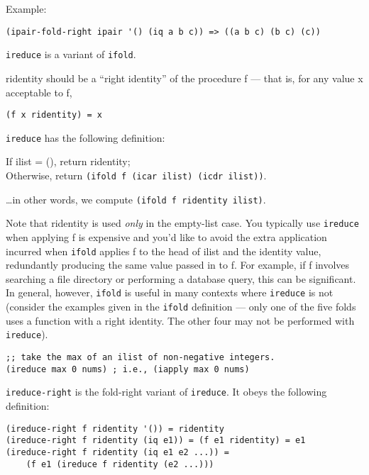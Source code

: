 \begin{description}
Example:

\begin{verbatim}
(ipair-fold-right ipair '() (iq a b c)) => ((a b c) (b c) (c))
\end{verbatim}
\item[ \href{}{} \texttt{ireduce} f ridentity ilist -\textgreater{}
value ]
\texttt{ireduce} is a variant of \texttt{ifold}.

ridentity should be a ``right identity'' of the procedure f --- that is,
for any value x acceptable to f,

\begin{verbatim}
(f x ridentity) = x
\end{verbatim}

\texttt{ireduce} has the following definition:

If ilist = (), return ridentity;\\
Otherwise, return \texttt{(ifold\ f\ (icar\ ilist)\ (icdr\ ilist))}.

\ldots{}in other words, we compute
\texttt{(ifold\ f\ ridentity\ ilist)}.

Note that ridentity is used \emph{only} in the empty-list case. You
typically use \texttt{ireduce} when applying f is expensive and you'd
like to avoid the extra application incurred when \texttt{ifold} applies
f to the head of ilist and the identity value, redundantly producing the
same value passed in to f. For example, if f involves searching a file
directory or performing a database query, this can be significant. In
general, however, \texttt{ifold} is useful in many contexts where
\texttt{ireduce} is not (consider the examples given in the
\texttt{ifold} definition --- only one of the five folds uses a function
with a right identity. The other four may not be performed with
\texttt{ireduce}).

\begin{verbatim}
;; take the max of an ilist of non-negative integers.
(ireduce max 0 nums) ; i.e., (iapply max 0 nums)
\end{verbatim}
\item[ \href{}{} \texttt{ireduce-right} f ridentity ilist
-\textgreater{} value ]
\texttt{ireduce-right} is the fold-right variant of \texttt{ireduce}. It
obeys the following definition:

\begin{verbatim}
(ireduce-right f ridentity '()) = ridentity
(ireduce-right f ridentity (iq e1)) = (f e1 ridentity) = e1
(ireduce-right f ridentity (iq e1 e2 ...)) =
    (f e1 (ireduce f ridentity (e2 ...)))
\end{verbatim}


\end{description}
